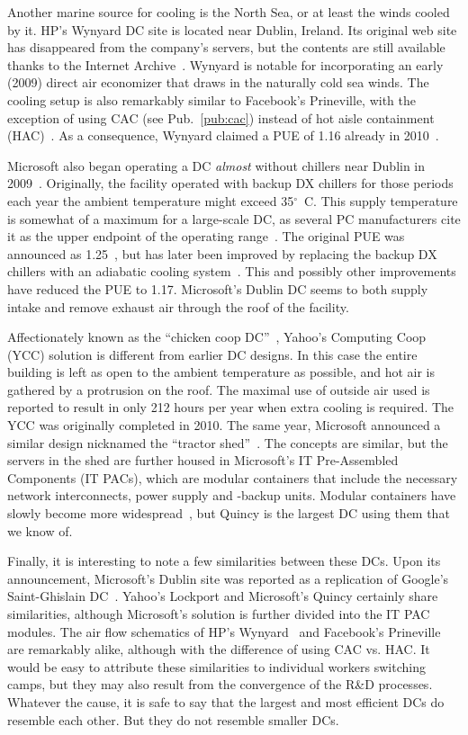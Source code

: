 \documentclass[officiallayout]{tktla}
\begin{document}
Another marine source for cooling is the North Sea, or at least the winds
cooled by it. HP's Wynyard DC site is located near Dublin, Ireland. Its
original web site has disappeared from the company's servers, but the contents
are still available thanks to the Internet Archive~\cite{HP2009}. Wynyard is
notable for incorporating an early (2009) direct air economizer that draws in
the naturally cold sea winds. The cooling setup is also remarkably similar to
Facebook's Prineville, with the exception of using CAC (see
Pub.~\ref{pub:cac}) instead of hot aisle containment
(HAC)~\cite{Hamilton2011}. As a consequence, Wynyard claimed a PUE of 1.16
already in 2010~\cite{Saran2010}.

Microsoft also began operating a DC \emph{almost} without chillers near Dublin
in 2009~\cite{Metz2009}. Originally, the facility operated with backup DX
chillers for those periods each year the ambient temperature might exceed
35$^\circ$~C. This supply temperature is somewhat of a maximum for a
large-scale DC, as several PC manufacturers cite it as the upper endpoint of
the operating range~\cite{Belady2008,Google2011}. The original PUE was
announced as 1.25~\cite{Microsoft2009}, but has later been improved by
replacing the backup DX chillers with an adiabatic cooling
system~\cite{Miller2013b}. This and possibly other improvements have reduced
the PUE to 1.17. Microsoft's Dublin DC seems to both supply intake and remove
exhaust air through the roof of the facility.

Affectionately known as the ``chicken coop DC''~\cite{Miller2010b}, Yahoo's
Computing Coop (YCC) solution is different from earlier DC designs. In this
case the entire building is left as open to the ambient temperature as
possible, and hot air is gathered by a protrusion on the roof. The maximal use
of outside air used is reported to result in only 212 hours per year when
extra cooling is required. The YCC was originally completed in 2010. The same
year, Microsoft announced a similar design nicknamed the ``tractor
shed''~\cite{Miller2011}. The concepts are similar, but the servers in the
shed are further housed in Microsoft's IT Pre-Assembled Components (IT PACs),
which are modular containers that include the necessary network interconnects,
power supply and -backup units. Modular containers have slowly become more
widespread~\cite{Stansberry2012}, but Quincy is the largest DC using them that
we know of.

Finally, it is interesting to note a few similarities between these DCs. Upon
its announcement, Microsoft's Dublin site was reported as a replication of
Google's Saint-Ghislain DC~\cite{Metz2009}. Yahoo's Lockport and Microsoft's
Quincy certainly share similarities, although Microsoft's solution is further
divided into the IT PAC modules. The air flow schematics of HP's
Wynyard~\cite{Saran2010} and Facebook's Prineville~\cite{Hamilton2011} are
remarkably alike, although with the difference of using CAC vs. HAC. It would
be easy to attribute these similarities to individual workers switching camps,
but they may also result from the convergence of the R\&D processes.  Whatever
the cause, it is safe to say that the largest and most efficient DCs do
resemble each other. But they do not resemble smaller DCs.
\end{document}
